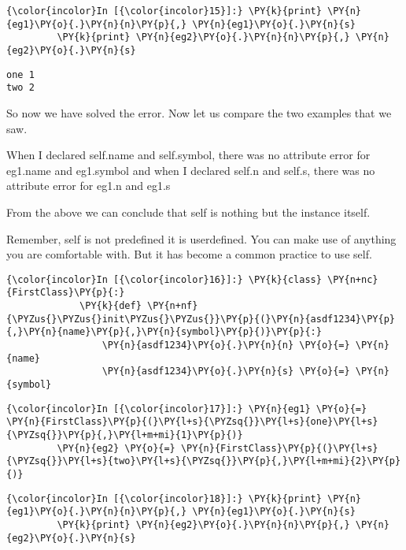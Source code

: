     \begin{Verbatim}[commandchars=\\\{\}]
{\color{incolor}In [{\color{incolor}15}]:} \PY{k}{print} \PY{n}{eg1}\PY{o}{.}\PY{n}{n}\PY{p}{,} \PY{n}{eg1}\PY{o}{.}\PY{n}{s}
         \PY{k}{print} \PY{n}{eg2}\PY{o}{.}\PY{n}{n}\PY{p}{,} \PY{n}{eg2}\PY{o}{.}\PY{n}{s}
\end{Verbatim}

    \begin{Verbatim}[commandchars=\\\{\}]
one 1
two 2
    \end{Verbatim}

    So now we have solved the error. Now let us compare the two examples
that we saw.

When I declared self.name and self.symbol, there was no attribute error
for eg1.name and eg1.symbol and when I declared self.n and self.s, there
was no attribute error for eg1.n and eg1.s

From the above we can conclude that self is nothing but the instance
itself.

Remember, self is not predefined it is userdefined. You can make use of
anything you are comfortable with. But it has become a common practice
to use self.

    \begin{Verbatim}[commandchars=\\\{\}]
{\color{incolor}In [{\color{incolor}16}]:} \PY{k}{class} \PY{n+nc}{FirstClass}\PY{p}{:}
             \PY{k}{def} \PY{n+nf}{\PYZus{}\PYZus{}init\PYZus{}\PYZus{}}\PY{p}{(}\PY{n}{asdf1234}\PY{p}{,}\PY{n}{name}\PY{p}{,}\PY{n}{symbol}\PY{p}{)}\PY{p}{:}
                 \PY{n}{asdf1234}\PY{o}{.}\PY{n}{n} \PY{o}{=} \PY{n}{name}
                 \PY{n}{asdf1234}\PY{o}{.}\PY{n}{s} \PY{o}{=} \PY{n}{symbol}
\end{Verbatim}

    \begin{Verbatim}[commandchars=\\\{\}]
{\color{incolor}In [{\color{incolor}17}]:} \PY{n}{eg1} \PY{o}{=} \PY{n}{FirstClass}\PY{p}{(}\PY{l+s}{\PYZsq{}}\PY{l+s}{one}\PY{l+s}{\PYZsq{}}\PY{p}{,}\PY{l+m+mi}{1}\PY{p}{)}
         \PY{n}{eg2} \PY{o}{=} \PY{n}{FirstClass}\PY{p}{(}\PY{l+s}{\PYZsq{}}\PY{l+s}{two}\PY{l+s}{\PYZsq{}}\PY{p}{,}\PY{l+m+mi}{2}\PY{p}{)}
\end{Verbatim}

    \begin{Verbatim}[commandchars=\\\{\}]
{\color{incolor}In [{\color{incolor}18}]:} \PY{k}{print} \PY{n}{eg1}\PY{o}{.}\PY{n}{n}\PY{p}{,} \PY{n}{eg1}\PY{o}{.}\PY{n}{s}
         \PY{k}{print} \PY{n}{eg2}\PY{o}{.}\PY{n}{n}\PY{p}{,} \PY{n}{eg2}\PY{o}{.}\PY{n}{s}
\end{Verbatim}

